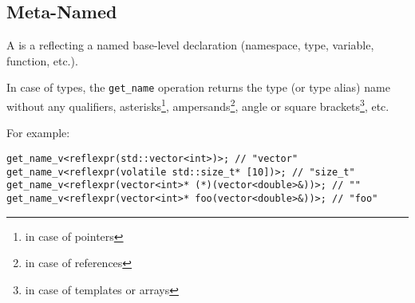 \subsection{Meta-Named}
\label{concept-Meta-Named}

A  is a  reflecting a named base-level declaration
(namespace, type, variable, function, etc.).





In case of types, the \texttt{get\_name} operation returns the type (or type alias)
name without any qualifiers, asterisks\footnote{in case of pointers},
ampersands\footnote{in case of references}, angle or square brackets\footnote{
in case of templates or arrays}, etc.

For example:

\begin{verbatim}
get_name_v<reflexpr(std::vector<int>)>; // "vector"
get_name_v<reflexpr(volatile std::size_t* [10])>; // "size_t"
get_name_v<reflexpr(vector<int>* (*)(vector<double>&))>; // ""
get_name_v<reflexpr(vector<int>* foo(vector<double>&))>; // "foo"
\end{verbatim}

